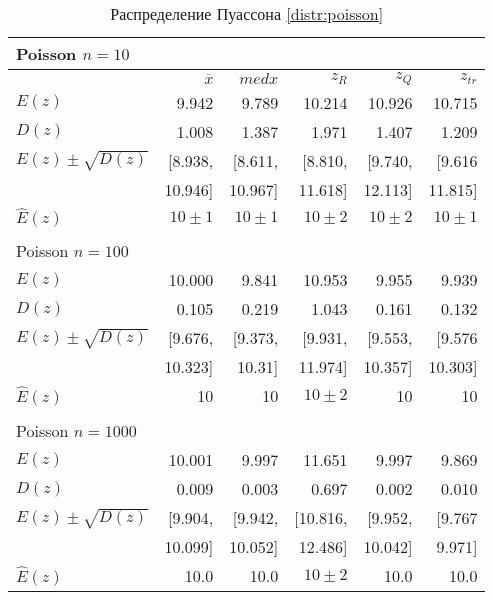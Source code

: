 \documentclass[a4paper]{article}
\begin{document}
\begin{table}[H]
	\centering
	\begin{tabular}[t]{|l|r|r|r|r|r|}
		\hline
		Poisson $n = 10$ & & & & & \\
		\hline
		& $\overline{x}$ & $med x$ &       $z_R$ &      $z_Q$ &      $z_{tr}$ \\
		\hline
		$E(z)$   & 9.942 & 9.789 & 10.214 & 10.926 & 10.715\\
		\hline
		$D(z)$   & 1.008 & 1.387 & 1.971 & 1.407 & 1.209\\
		\hline
		$E(z) \pm \sqrt{D(z)}$ & [8.938, &[8.611, &[8.810, &[9.740,  &[9.616\\
		&10.946]& 10.967]& 11.618]& 12.113]& 11.815]\\
		\hline
		$\widehat{E}(z)$ & $10 \pm 1$ & $10 \pm 1$ & $10 \pm 2$ & $10 \pm 2$ & $10 \pm 1$\\
		\hline
		& & & & & \\
		\hline 
		Poisson $n = 100$ & & & & & \\
		\hline
		$E(z)$ & 10.000 & 9.841 & 10.953 & 9.955 & 9.939\\
		\hline
		$D(z)$ & 0.105 & 0.219 & 1.043 & 0.161 & 0.132\\
		\hline
		$E(z) \pm \sqrt{D(z)}$ & [9.676, &[9.373, &[9.931, &[9.553, &[9.576\\
		& 10.323]& 10.31]& 11.974]& 10.357]& 10.303]\\
		\hline
		$\widehat{E}(z)$ & 10 & 10 & $10 \pm 2$ & 10 & 10\\
		\hline
		& & & & & \\
		\hline 
		Poisson $n = 1000$ & & & & & \\
		\hline
		$E(z)$ & 10.001 & 9.997 & 11.651 & 9.997 & 9.869\\
		\hline
		$D(z)$ & 0.009 & 0.003 & 0.697 & 0.002 & 0.010\\
		\hline
		$E(z) \pm \sqrt{D(z)}$ & [9.904, &[9.942, &[10.816, &[9.952,  &[9.767\\
		& 10.099]& 10.052]& 12.486]& 10.042]& 9.971]\\
		\hline
		$\widehat{E}(z)$ & 10.0 & 10.0 & $10 \pm 2$ & 10.0 & 10.0\\
		\hline
	\end{tabular}
	\caption{Распределение Пуассона \eqref{distr:poisson}}
	\label{table:poisson}
\end{table}
\end{document}
